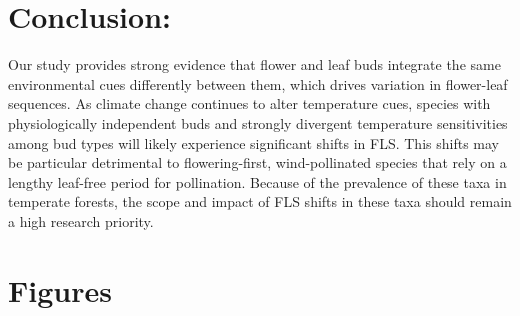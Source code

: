 \documentclass[11pt]{article}
\begin{document}

\section*{Conclusion:}
Our study provides strong evidence that flower and leaf buds integrate the same environmental cues differently between them, which drives variation in flower-leaf sequences. As climate change continues to alter temperature cues, species with physiologically independent buds and strongly divergent temperature sensitivities among bud types will likely experience significant shifts in FLS. This shifts may be particular detrimental to flowering-first, wind-pollinated species that rely on a lengthy leaf-free period for pollination. Because of the prevalence of these taxa in temperate forests, the scope and impact of FLS shifts in these taxa should remain a high research priority.\\
 
 
\section*{Figures}
\end{document}

